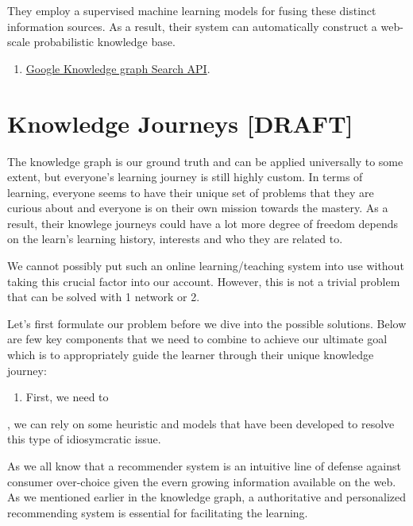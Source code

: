 \documentclass[]{book}
\providecommand{\tightlist}{%
  \setlength{\itemsep}{0pt}\setlength{\parskip}{0pt}}
\theoremstyle{definition}
\theoremstyle{definition}
\theoremstyle{definition}
\theoremstyle{remark}
\begin{document}
They employ a supervised machine learning models for fusing these
distinct information sources. As a result, their system can
automatically construct a web-scale probabilistic knowledge base.

\begin{enumerate}
\def\labelenumi{\arabic{enumi}.}
\setcounter{enumi}{1}
\tightlist
\item
  \href{https://developers.google.com/knowledge-graph/\#knowledge_graph_entities}{Google
  Knowledge graph Search API}.
\end{enumerate}

\section{Knowledge Journeys {[}DRAFT{]}}\label{knowledge-journeys-draft}

The knowledge graph is our ground truth and can be applied universally
to some extent, but everyone's learning journey is still highly custom.
In terms of learning, everyone seems to have their unique set of
problems that they are curious about and everyone is on their own
mission towards the mastery. As a result, their knowlege journeys could
have a lot more degree of freedom depends on the learn's learning
history, interests and who they are related to.

We cannot possibly put such an online learning/teaching system into use
without taking this crucial factor into our account. However, this is
not a trivial problem that can be solved with 1 network or 2.

Let's first formulate our problem before we dive into the possible
solutions. Below are few key components that we need to combine to
achieve our ultimate goal which is to appropriately guide the learner
through their unique knowledge journey:

\begin{enumerate}
\def\labelenumi{\arabic{enumi}.}
\tightlist
\item
  First, we need to
\end{enumerate}

, we can rely on some heuristic and models that have been developed to
resolve this type of idiosymcratic issue.

As we all know that a recommender system is an intuitive line of defense
against consumer over-choice given the evern growing information
available on the web. As we mentioned earlier in the knowledge graph, a
authoritative and personalized recommending system is essential for
facilitating the learning.
\end{document}
